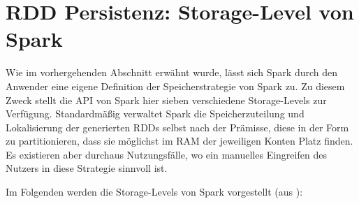 \section{RDD Persistenz: Storage-Level von Spark}
\label{section:storage lvl}

Wie im vorhergehenden Abschnitt erwähnt wurde, lässt sich Spark durch den Anwender eine eigene Definition der Speicherstrategie von Spark zu. Zu diesem Zweck stellt die API von Spark hier sieben verschiedene Storage-Levels  zur Verfügung. Standardmäßig verwaltet Spark die Speicherzuteilung und Lokalisierung der generierten RDDs selbst nach der Prämisse,  diese in der Form zu partitionieren, dass sie möglichst im RAM der jeweiligen Konten Platz finden. Es existieren aber durchaus Nutzungsfälle, wo ein manuelles Eingreifen des Nutzers in diese Strategie sinnvoll ist. 

Im Folgenden werden die Storage-Levels von Spark vorgestellt (aus ): 

